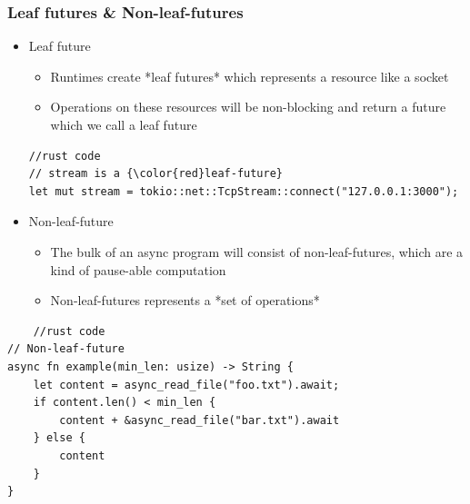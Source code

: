 \begin{frame}[fragile]
    \frametitle{Leaf futures \& Non-leaf-futures}
% 
% 
% 
    \begin{itemize}
        \item Leaf future
    	\begin{itemize}
    	    \item Runtimes create *leaf futures* which represents a resource like a socket
    	    \item Operations on these resources will be non-blocking and return a future which we call a leaf future
    	\end{itemize}
\begin{block}{}
\begin{verbatim}
//rust code
// stream is a {\color{red}leaf-future}
let mut stream = tokio::net::TcpStream::connect("127.0.0.1:3000");
\end{verbatim}
\end{block}

        \item Non-leaf-future
    	\begin{itemize}
    	    \item The bulk of an async program will consist of non-leaf-futures, which are a kind of pause-able computation
    	    \item Non-leaf-futures represents a *set of operations*
    	\end{itemize}
    \end{itemize}
% 
\begin{block}{}
    \begin{verbatim}
    //rust code
// Non-leaf-future
async fn example(min_len: usize) -> String {
    let content = async_read_file("foo.txt").await;
    if content.len() < min_len {
        content + &async_read_file("bar.txt").await
    } else {
        content
    }
}
    \end{verbatim}
\end{block}
% 
\end{frame}
